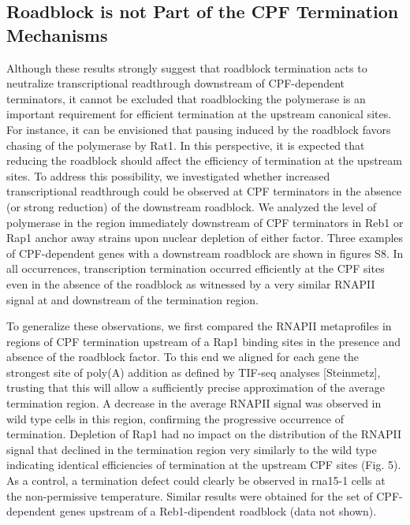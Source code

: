 \singlespacing
\subsection*{Roadblock is not Part of the CPF Termination Mechanisms}
\doublespacing


Although these results strongly suggest that roadblock termination acts to neutralize transcriptional readthrough downstream of CPF-dependent terminators, it cannot be excluded that roadblocking the polymerase is an important requirement for efficient termination at the upstream canonical sites. For instance, it can be envisioned that pausing induced by the roadblock favors chasing of the polymerase by Rat1. In this perspective, it is expected that reducing the roadblock should affect the efficiency of termination at the upstream sites. To address this possibility, we investigated whether increased transcriptional readthrough could be observed at CPF terminators in the absence (or strong reduction) of the downstream roadblock. We analyzed the level of polymerase in the region immediately downstream of CPF terminators in Reb1 or Rap1 anchor away strains upon nuclear depletion of either factor. Three examples of CPF-dependent genes with a downstream roadblock are shown in figures S8. In all occurrences, transcription termination occurred efficiently at the CPF sites even in the absence of the roadblock as witnessed by a very similar RNAPII signal at and downstream of the termination region. 

To generalize these observations, we first compared the RNAPII metaprofiles in regions of CPF termination upstream of a Rap1 binding sites in the presence and absence of the roadblock factor. To this end we aligned for each gene the strongest site of poly(A) addition as defined by TIF-seq analyses [Steinmetz], trusting that this will allow a sufficiently precise approximation of the average termination region. A decrease in the average RNAPII signal was observed in wild type cells in this region, confirming the progressive occurrence of termination. Depletion of Rap1 had no impact on the distribution of the RNAPII signal that declined in the termination region very similarly to the wild type indicating identical efficiencies of termination at the upstream CPF sites (Fig. 5). As a control, a termination defect could clearly be observed in rna15-1 cells at the non-permissive temperature. Similar results were obtained for the set of CPF-dependent genes upstream of a Reb1-dipendent roadblock (data not shown). 

